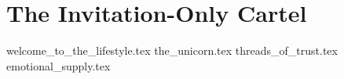 
\section{The Invitation-Only Cartel}




{welcome_to_the_lifestyle.tex}
{the_unicorn.tex}
{threads_of_trust.tex}
{emotional_supply.tex}